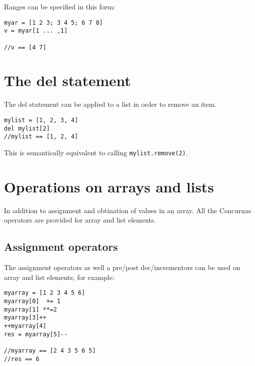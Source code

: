 \documentclass[conc-doc]{subfiles}
\begin{document}
Ranges can be specified in this form:
\begin{lstlisting}
myar = [1 2 3; 3 4 5; 6 7 8]
v = myar[1 ... ,1]

//v == [4 7]
\end{lstlisting}

\section{The del statement}
The del statement can be applied to a list in order to remove an item.
\begin{lstlisting}
mylist = [1, 2, 3, 4]
del mylist[2]
//mylist == [1, 2, 4]
\end{lstlisting}

This is semantically equivalent to calling \lstinline{mylist.remove(2)}.

\section{Operations on arrays and lists}
In addition to assignment and obtination of values in an array. All the Concurnas operators are provided for array and list elements.

\subsection{Assignment operators}
The assignment operators as well a pre/post dec/incrementors can be used on array and list elements, for example:
\begin{lstlisting}
myarray = [1 2 3 4 5 6]
myarray[0]  += 1
myarray[1] **=2
myarray[3]++
++myarray[4]
res = myarray[5]--

//myarray == [2 4 3 5 6 5]
//res == 6
\end{lstlisting}
\end{document}
